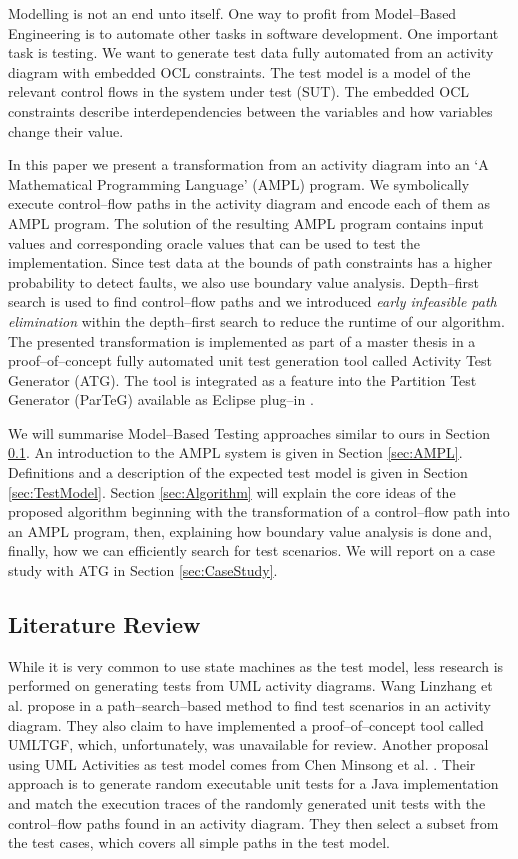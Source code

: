 \documentclass[runningheads,a4paper]{llncs}%
\begin{document}
Modelling is not an end unto itself. One way to profit from Model--Based Engineering is to automate other tasks in software development. One important task is testing. We want to generate test data fully automated from an activity diagram with embedded OCL constraints. The test model is a model of the relevant control flows in the system under test (SUT). The embedded OCL constraints describe interdependencies between the variables and how variables change their value.

In this paper we present a transformation from an activity diagram into an `A Mathematical Programming Language' (AMPL) program. We symbolically execute control--flow paths in the activity diagram and encode each of them as AMPL program. The solution of the resulting AMPL program contains input values and corresponding oracle values that can be used to test the implementation. Since test data at the bounds of path constraints has a higher probability to detect faults, we also use boundary value analysis. Depth--first search is used to find control--flow paths and we introduced \emph{early infeasible path elimination} within the depth--first search to reduce the runtime of our algorithm. The presented transformation is implemented as part of a master thesis \cite{Kurth2014AutomatedGen} in a proof--of--concept fully automated unit test generation tool called Activity Test Generator (ATG). The tool is integrated as a feature into the Partition Test Generator (ParTeG) available as Eclipse plug--in \cite{PartegWebsite}.

We will summarise Model--Based Testing approaches similar to ours in Section \ref{sec:LiteratureReview}. An introduction to the AMPL system is given in Section \ref{sec:AMPL}. Definitions and a description of the expected test model is given in Section \ref{sec:TestModel}. Section \ref{sec:Algorithm} will explain the core ideas of the proposed algorithm beginning with the transformation of a control--flow path into an AMPL program, then, explaining how boundary value analysis is done and, finally, how we can efficiently search for test scenarios. We will report on a case study with ATG in Section \ref{sec:CaseStudy}.%
\subsection{Literature Review}%
\label{sec:LiteratureReview}%
While it is very common to use state machines as the test model, less research is performed on generating tests from UML activity diagrams. Wang Linzhang et al. propose in \cite{Linzhang04GeneratingTestCasefromActivityGrayBoxMethod} a path--search--based method to find test scenarios in an activity diagram. They also claim to have implemented a proof--of--concept tool called UMLTGF, which, unfortunately, was unavailable for review. Another proposal using UML Activities as test model comes from Chen Minsong et al. \cite{mingsong2006automatic}. Their approach is to generate random executable unit tests for a Java implementation and match the execution traces of the randomly generated unit tests with the control--flow paths found in an activity diagram. They then select a subset from the test cases, which covers all simple paths in the test model.
\end{document}
